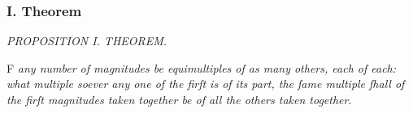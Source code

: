 \documentclass[11pt,preview]{standalone}
\begin{document}
\newcommand{\reddomes}{\reddome\hspace{-0.75ex}\reddome\hspace{-0.75ex}\reddome\hspace{-0.75ex}\reddome\hspace{-0.75ex}\reddome}
\newcommand{\yellowhomes}{\yellowhome\hspace{-0.75ex}\yellowhome\hspace{-0.75ex}\yellowhome\hspace{-0.75ex}\yellowhome\hspace{-0.75ex}\yellowhome}
\newcommand{\bluedrops}{\bluedrop\hspace{-0.75ex}\bluedrop\hspace{-0.75ex}\bluedrop\hspace{-0.75ex}\bluedrop\hspace{-0.75ex}\bluedrop}

\subsubsection{I. Theorem}

\begin{minipage}{\textwidth}
    \begin{center}
        \textit{PROPOSITION I. THEOREM.}\label{book5pr1} \\
    \end{center}

    \hfill

    \begin{center}
        \raggedright \lettrine[lines=3, loversize=1, nindent=0pt]{}{}F \textit{any number of magnitudes be equimultiples of as many others, each of each: what multiple soever any one of the firſt is of its part, the ſame multiple ſhall of the firſt magnitudes taken together be of all the others taken together}.
    \end{center}
\end{minipage}

\hfill
\end{document}
